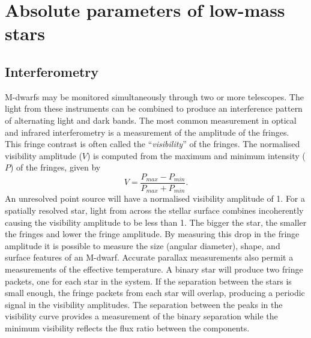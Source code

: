     
\section{Absolute parameters of low-mass stars}
    






\subsection{Interferometry}

M-dwarfs may be monitored simultaneously through two or more telescopes. The light from these instruments can be combined to produce an interference pattern of alternating light and dark bands. The most common measurement in optical and infrared interferometry is a measurement of the amplitude of the fringes. This fringe contrast is often called the ``\textit{visibility}'' of the fringes.  The normalised visibility amplitude ($V$) is computed from the maximum and minimum intensity ($P$) of the fringes, given by
%
\begin{equation}
V = \frac{P_{max} - P_{min}}{P_{max} + P_{min}}.
\end{equation}
%
An unresolved point source will have a normalised visibility amplitude of 1.  For a spatially resolved star, light from across the stellar surface combines incoherently causing the visibility amplitude to be less than 1.  The bigger the star, the smaller the fringes and lower the fringe amplitude.  By measuring this drop in the fringe amplitude it is possible to measure the size (angular diameter), shape, and surface features of an M-dwarf. Accurate parallax measurements also permit a measurements of the effective temperature. A binary star will produce two fringe packets, one for each star in the system.  If the separation between the stars is small enough, the fringe packets from each star will overlap, producing a periodic signal in the visibility amplitudes.  The separation between the peaks in the visibility curve provides a measurement of the binary separation while the minimum visibility reflects the flux ratio between the components. 

